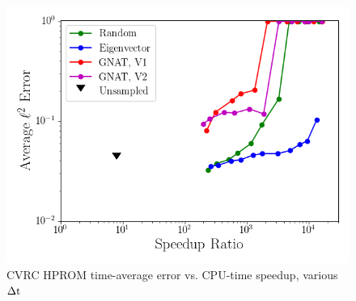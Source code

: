 \begin{figure}
	\centering
	\begin{minipage}{0.49\linewidth}
		\includegraphics[width=0.99\linewidth]{Chapters/CavityAndCVRC/Images/cvrc/deim/sampled_dt1e-6_Average_errorRaw_pareto.png}
		\subcaption{$\dt = 10 \times \dtFOM$}
	\end{minipage}
	\caption{\label{fig:cvrcSampledROMErrVsTime}CVRC HPROM time-average error vs. CPU-time speedup, various $\Delta \text{t}$}
\end{figure}




